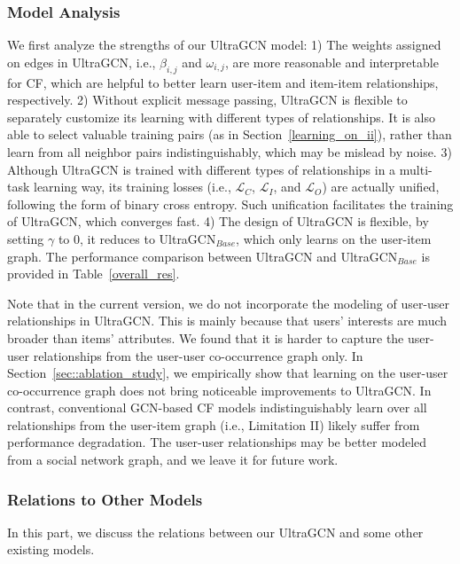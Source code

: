 \documentclass[sigconf,authorversion]{acmart}
\begin{document}
\subsubsection{Model Analysis}
We first analyze the strengths of our UltraGCN model: 1) The weights assigned on edges in UltraGCN, i.e., $\beta_{i, j}$ and $\omega_{i, j}$, are more reasonable and interpretable for CF, which are helpful to better learn user-item and item-item relationships, respectively. 
2) Without explicit message passing, UltraGCN is flexible to separately customize its learning with different types of relationships. It is also able to select valuable training pairs (as in Section~\ref{learning_on_ii}), rather than learn from all neighbor pairs indistinguishably, which may be mislead by noise. 3) Although UltraGCN is trained with different types of relationships in a multi-task learning way, its training losses (i.e., $\mathcal{L}_C$, $\mathcal{L}_I$, and $\mathcal{L}_{O}$) are actually unified, following the form of binary cross entropy. Such unification facilitates the training of UltraGCN, which converges fast. 4) The design of UltraGCN is flexible, by setting $\gamma$ to 0, it reduces to UltraGCN$_{Base}$, which only learns on the user-item graph. The performance comparison between UltraGCN and UltraGCN$_{Base}$ is provided in Table~\ref{overall_res}.



Note that in the current version, we do not incorporate the modeling of user-user relationships in UltraGCN. This is mainly because that users' interests are much broader than items' attributes. We found that it is harder to capture the user-user relationships from the user-user co-occurrence graph only. In Section~\ref{sec::ablation_study}, we empirically show that learning on the user-user co-occurrence graph does not bring noticeable improvements to UltraGCN. In contrast, conventional GCN-based CF models indistinguishably learn over all relationships from the user-item graph (i.e., Limitation II) likely suffer from performance degradation. The user-user relationships may be better modeled from 
a social network graph, and we leave it for future work. 






\subsubsection{Relations to Other Models}
\label{sec::relations_to_other_models}
In this part, we discuss the relations between our UltraGCN and some other existing models.
\end{document}
